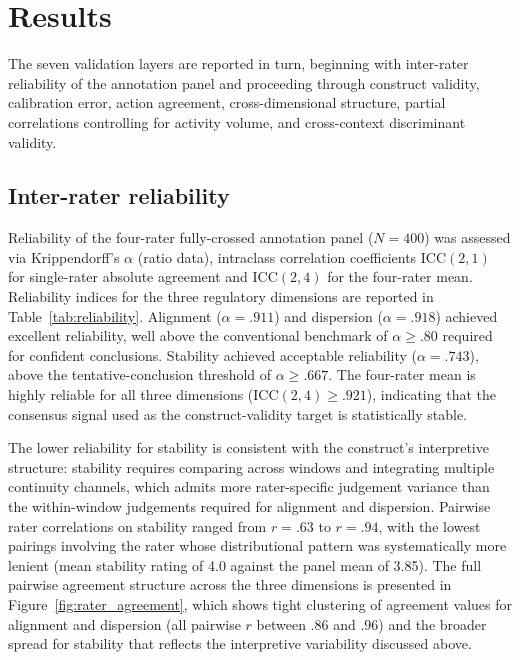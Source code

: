 \documentclass[preprint,12pt,authoryear]{elsarticle}
\begin{document}
\section{Results}
\label{sec:results}

The seven validation layers are reported in turn, beginning with inter-rater reliability of the annotation panel and proceeding through construct validity, calibration error, action agreement, cross-dimensional structure, partial correlations controlling for activity volume, and cross-context discriminant validity.

\subsection{Inter-rater reliability}
\label{sec:results-reliability}

Reliability of the four-rater fully-crossed annotation panel ($N = 400$) was assessed via Krippendorff's $\alpha$ (ratio data), intraclass correlation coefficients ICC$(2,1)$ for single-rater absolute agreement and ICC$(2,4)$ for the four-rater mean. Reliability indices for the three regulatory dimensions are reported in Table~\ref{tab:reliability}. Alignment ($\alpha = .911$) and dispersion ($\alpha = .918$) achieved excellent reliability, well above the conventional benchmark of $\alpha \geq .80$ required for confident conclusions. Stability achieved acceptable reliability ($\alpha = .743$), above the tentative-conclusion threshold of $\alpha \geq .667$. The four-rater mean is highly reliable for all three dimensions (ICC$(2,4) \geq .921$), indicating that the consensus signal used as the construct-validity target is statistically stable.

The lower reliability for stability is consistent with the construct's interpretive structure: stability requires comparing across windows and integrating multiple continuity channels, which admits more rater-specific judgement variance than the within-window judgements required for alignment and dispersion. Pairwise rater correlations on stability ranged from $r = .63$ to $r = .94$, with the lowest pairings involving the rater whose distributional pattern was systematically more lenient (mean stability rating of 4.0 against the panel mean of 3.85). The full pairwise agreement structure across the three dimensions is presented in Figure~\ref{fig:rater_agreement}, which shows tight clustering of agreement values for alignment and dispersion (all pairwise $r$ between $.86$ and $.96$) and the broader spread for stability that reflects the interpretive variability discussed above.
\end{document}
